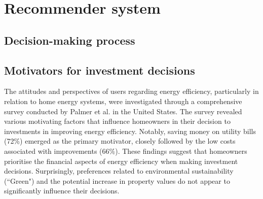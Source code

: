 %
%


\section{Recommender system}

\subsection{Decision-making process}


\subsection{Motivators for investment decisions}

The attitudes and perspectives of users regarding energy efficiency, particularly in relation to home energy systems, were investigated through a comprehensive survey conducted by Palmer et al. \cite{informationgap} in the United States.
The survey revealed various motivating factors that influence homeowners in their decision to investments in improving energy efficiency. 
Notably, saving money on utility bills (72\%) emerged as the primary motivator, 
closely followed by the low costs associated with improvements (66\%). 
These findings suggest that homeowners prioritise the financial aspects of energy efficiency when making investment decisions. 
Surprisingly, preferences related to environmental sustainability (``Green") and the potential increase in property values do not appear to significantly influence their decisions.


